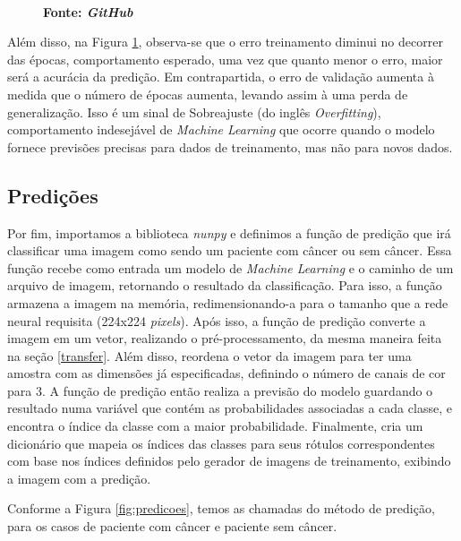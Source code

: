 \begin{figure}[ht]
\begin{minipage}{0.45\textwidth}
  \captionsetup{justification=centering}
  \vspace{-0.2cm}
  \\\textbf{\footnotesize Fonte: \textit{GitHub}}
  \label{fig:loss10}
\end{minipage}
\end{figure}

Além disso, na Figura \ref{fig:loss10}, observa-se que o erro treinamento diminui no decorrer das épocas, comportamento esperado, uma vez que quanto menor o erro, maior será a acurácia da predição. Em contrapartida, o erro de validação aumenta à medida que o número de épocas aumenta, levando assim à uma perda de generalização. Isso é um sinal de Sobreajuste (do inglês \textit{Overfitting}), comportamento indesejável de \textit{Machine Learning} que ocorre quando o modelo fornece previsões precisas para dados de treinamento, mas não para novos dados.



\subsection{\esp Predições} \label{pred}

Por fim, importamos a biblioteca \textit{nunpy} e definimos a função de predição que irá classificar uma imagem como sendo um paciente com câncer ou sem câncer. Essa função recebe como entrada um modelo de \textit{Machine Learning} e o caminho de um arquivo de imagem, retornando o resultado da classificação. Para isso, a função armazena a imagem na memória, redimensionando-a para o tamanho que a rede neural requisita (224x224 \textit{pixels}). Após isso, a função de predição converte a imagem em um vetor, realizando o pré-processamento, da mesma maneira feita na seção \ref{transfer}. Além disso, reordena o vetor da imagem para ter uma amostra com as dimensões já especificadas, definindo o número de canais de cor para 3. A função de predição então realiza a previsão do modelo guardando o resultado numa variável que contém as probabilidades associadas a cada classe, e encontra o índice da classe com a maior probabilidade. Finalmente, cria um dicionário que mapeia os índices das classes para seus rótulos correspondentes com base nos índices definidos pelo gerador de imagens de treinamento, exibindo a imagem com a predição.

Conforme a Figura \ref{fig:predicoes}, temos as chamadas do método de predição, para os casos de paciente com câncer e paciente sem câncer.

